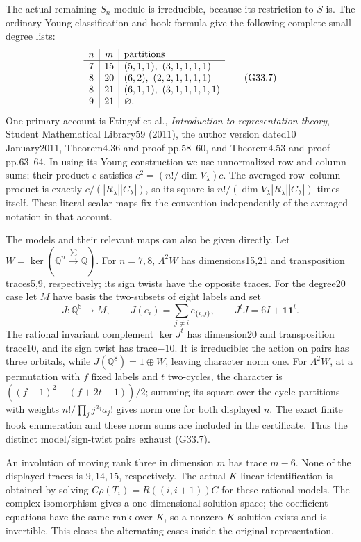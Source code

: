 The actual remaining \(S_n\)-module is irreducible, because its
restriction to \(S\) is. The ordinary Young classification and
hook formula give the following complete small-degree lists:
\[
\begin{array}{c|c|l}
n&m&\hbox{partitions}\\\hline
7&15&(5,1,1),\ (3,1,1,1,1)\\
8&20&(6,2),\ (2,2,1,1,1,1)\\
8&21&(6,1,1),\ (3,1,1,1,1,1)\\
9&21&\varnothing.
\end{array}                                                    \tag{G33.7}
\]
One primary account is Etingof et al., \emph{Introduction to
representation theory}, Student Mathematical Library59 (2011),
the author version dated10 January2011, Theorem4.36 and proof
pp.58--60, and Theorem4.53 and proof pp.63--64. In using its
Young construction we use unnormalized row and column sums;
their product \(c\) satisfies
\(c^2=(n!/\dim V_\lambda)c\). The averaged row--column product
is exactly \(c/(|R_\lambda||C_\lambda|)\), so its square is
\(n!/(\dim V_\lambda|R_\lambda||C_\lambda|)\) times itself.
These literal scalar maps fix the convention independently of
the averaged notation in that account.

The models and their relevant maps can also be given directly.
Let \(W=\ker(\mathbb Q^n\xrightarrow{\sum}\mathbb Q)\).
For \(n=7,8\), \(\Lambda^2W\) has dimensions15,21 and
transposition traces5,9, respectively; its sign twists have the
opposite traces. For the degree20 case let \(M\) have basis the
two-subsets of eight labels and set
\[
 J:\mathbb Q^8\longrightarrow M,\qquad
 J(e_i)=\sum_{j\ne i}e_{\{i,j\}},\qquad
 J^tJ=6I+\boldsymbol1\boldsymbol1^t.
                                                               \tag{G33.8}
\]
The rational invariant complement \(\ker J^t\) has dimension20
and transposition trace10, and its sign twist has trace\(-10\).
It is irreducible: the action on pairs has three orbitals, while
\(J(\mathbb Q^8)=1\oplus W\), leaving character norm one.
For \(\Lambda^2W\), at a permutation with \(f\) fixed labels
and \(t\) two-cycles, the character is
\(((f-1)^2-(f+2t-1))/2\); summing its square over the cycle
partitions with weights \(n!/\prod_j j^{a_j}a_j!\) gives norm
one for both displayed \(n\). The exact finite hook enumeration
and these norm sums are included in the certificate. Thus the
distinct model/sign-twist pairs exhaust (G33.7).

An involution of moving rank three in dimension \(m\) has trace
\(m-6\). None of the displayed traces is \(9,14,15\),
respectively. The actual \(K\)-linear identification is obtained
by solving
\(C\rho(T_i)=R((i,i+1))C\) for these rational models. The
complex isomorphism gives a one-dimensional solution space;
the coefficient equations have the same rank over \(K\), so
a nonzero \(K\)-solution exists and is invertible. This closes
the alternating cases inside the original representation.

